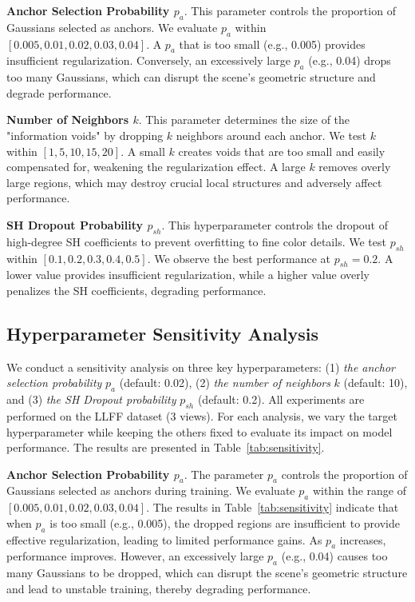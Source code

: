 \vspace{1mm}
\noindent\textbf{Anchor Selection Probability $p_a$}. This parameter controls the proportion of Gaussians selected as anchors. We evaluate $p_a$ within $[0.005, 0.01, 0.02, 0.03, 0.04]$.
A $p_a$ that is too small (e.g., 0.005) provides insufficient regularization. Conversely, an excessively large $p_a$ (e.g., 0.04) drops too many Gaussians, which can disrupt the scene's geometric structure and degrade performance.

\vspace{1mm}
\noindent\textbf{Number of Neighbors $k$}. This parameter determines the size of the "information voids" by dropping $k$ neighbors around each anchor. We test $k$ within $[1, 5, 10, 15, 20]$.
A small $k$ creates voids that are too small and easily compensated for, weakening the regularization effect. A large $k$ removes overly large regions, which may destroy crucial local structures and adversely affect performance.

\vspace{1mm}
\noindent\textbf{SH Dropout Probability $p_{sh}$}. This hyperparameter controls the dropout of high-degree SH coefficients to prevent overfitting to fine color details. We test $p_{sh}$ within $[0.1, 0.2, 0.3, 0.4, 0.5]$.
We observe the best performance at $p_{sh}=0.2$. A lower value provides insufficient regularization, while a higher value overly penalizes the SH coefficients, degrading performance.


\subsection{Hyperparameter Sensitivity Analysis}
%
We conduct a sensitivity analysis on three key hyperparameters: (1) \textit{the anchor selection probability} $p_a$ (default: 0.02), (2) \textit{the number of neighbors} $k$ (default: 10), and (3) \textit{the SH Dropout probability} $p_{sh}$ (default: 0.2). All experiments are performed on the LLFF dataset (3 views). For each analysis, we vary the target hyperparameter while keeping the others fixed to evaluate its impact on model performance. The results are presented in Table~\ref{tab:sensitivity}.

\vspace{1mm}
\noindent\textbf{Anchor Selection Probability $p_a$}. The parameter $p_a$ controls the proportion of Gaussians selected as anchors during training.
We evaluate $p_a$ within the range of $[0.005, 0.01, 0.02, 0.03, 0.04]$.
% 
The results in Table~\ref{tab:sensitivity} indicate that when $p_a$ is too small (e.g., 0.005), the dropped regions are insufficient to provide effective regularization, leading to limited performance gains. As $p_a$ increases, performance improves. However, an excessively large $p_a$ (e.g., 0.04) causes too many Gaussians to be dropped, which can disrupt the scene's geometric structure and lead to unstable training, thereby degrading performance. 


